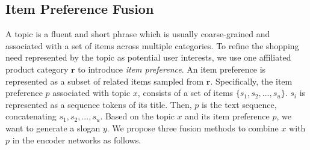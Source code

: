 \subsection{Item Preference Fusion}
\label{sec:preference}
A topic is a fluent and short phrase which is usually coarse-grained and associated with a set of items across multiple categories.
To refine the shopping need represented by the topic 
as potential user interests,
we use one affiliated product category $\mathbf{r}$ to introduce \emph{item preference}.
An item preference is represented as a subset of related items sampled from $\mathbf{ r }$.
Specifically, the item preference $p$ associated with topic $x$,
consists of a set of items 
$\{s_1, s_2, ..., s_u\}$. 
$s_i$ is represented as a sequence tokens of its title.
Then, $p$ is the text sequence, concatenating $s_1, s_2, ..., s_u$. 
Based on the topic $x$ and its item preference $p$, we want to generate 
a slogan $y$.
We propose three fusion methods to combine $x$ with $p$ in the encoder networks as follows.

